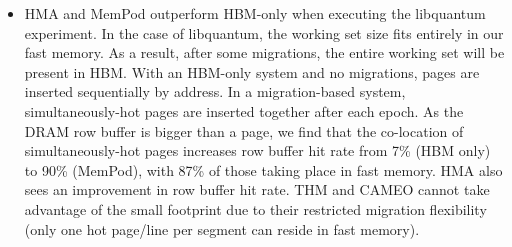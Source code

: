 \begin{itemize}[leftmargin=0.4cm]
	\item HMA and MemPod outperform HBM-only when executing the libquantum experiment. In the case of libquantum, the working set size fits entirely in our fast memory. As a result, after some migrations, the entire working set will be present in HBM.  With an HBM-only system and no migrations, pages
are inserted sequentially by address.  In a migration-based system, 
simultaneously-hot pages are inserted together after each epoch.  As the
DRAM row buffer is bigger than a page, we find that the co-location of
simultaneously-hot pages increases row buffer hit rate from 7\% (HBM only)
to 90\% (MemPod), with 87\% of those taking place in fast memory.  HMA also sees an improvement in row buffer hit rate. THM and CAMEO cannot take advantage of the small footprint due to their restricted migration flexibility (only one hot page/line per segment can reside in fast memory).
\end{itemize}

